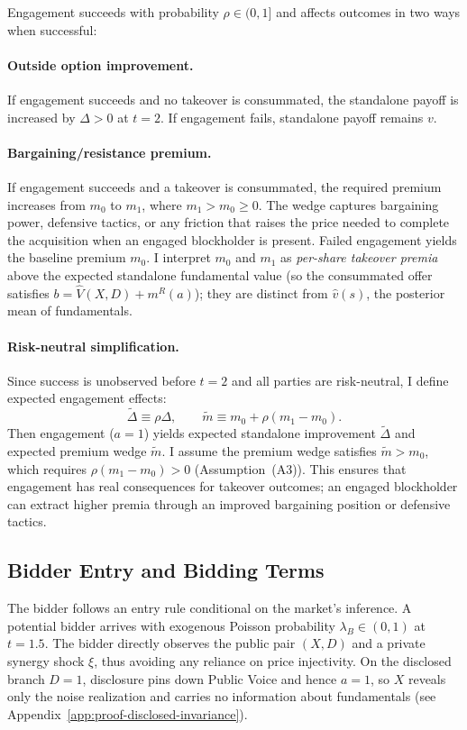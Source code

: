 \documentclass[11pt]{article}
\newcommand{\1}{\mathbf{1}}
\begin{document}
Engagement succeeds with probability $\rho \in (0,1]$ and affects outcomes in two ways when successful:

\paragraph{Outside option improvement.} If engagement succeeds and no takeover is consummated, the standalone payoff is increased by $\Delta > 0$ at $t=2$. If engagement fails, standalone payoff remains $v$.

\paragraph{Bargaining/resistance premium.} If engagement succeeds and a takeover is consummated, the required premium increases from $m_0$ to $m_1$, where $m_1 > m_0 \geq 0$. The wedge captures bargaining power, defensive tactics, or any friction that raises the price needed to complete the acquisition when an engaged blockholder is present. Failed engagement yields the baseline premium $m_0$.
I interpret $m_0$ and $m_1$ as \emph{per-share takeover premia} above the expected standalone fundamental value (so the consummated offer satisfies $b=\hat{V}(X,D)+m^{R}(a)$); they are distinct from $\hat{v}(s)$, the posterior mean of fundamentals.

\paragraph{Risk-neutral simplification.} Since success is unobserved before $t=2$ and all parties are risk-neutral, I define expected engagement effects:
\[
\tilde{\Delta} \equiv \rho \Delta, \qquad \tilde{m} \equiv m_0 + \rho(m_1 - m_0).
\]
Then engagement ($a=1$) yields expected standalone improvement $\tilde{\Delta}$ and expected premium wedge $\tilde{m}$. I assume the premium wedge satisfies $\tilde{m} > m_0$, which requires $\rho(m_1 - m_0) > 0$ (Assumption~\textup{(A3)}). This ensures that engagement has real consequences for takeover outcomes; an engaged blockholder can extract higher premia through an improved bargaining position or defensive tactics.

%
\subsection{Bidder Entry and Bidding Terms}
%

The bidder follows an entry rule conditional on the market's inference. A potential bidder arrives with exogenous Poisson probability $\lambda_B \in (0,1)$ at $t=1.5$. The bidder directly observes the public pair $(X,D)$ and a private synergy shock $\xi$, thus avoiding any reliance on price injectivity. On the disclosed branch $D=1$, disclosure pins down Public Voice and hence $a=1$, so $X$ reveals only the noise realization and carries no information about fundamentals (see Appendix~\ref{app:proof-disclosed-invariance}).
\end{document}
